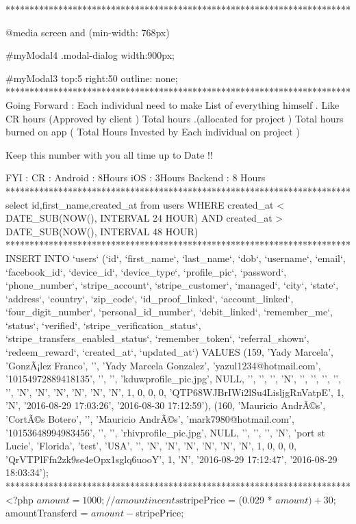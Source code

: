 ************************************************************************

@media screen and (min-width: 768px) {
    
    #myModal4 .modal-dialog  {width:900px;}

}
#myModal3 {
top:5%
right:50%
outline: none;
}
************************************************************************
Going Forward : Each individual need to make List of everything himself .
Like  CR hours (Approved by client )
Total hours .(allocated for project )
Total hours burned on app ( Total Hours Invested by Each individual on project ) 


Keep this number with you all time up to Date !! 


FYI :  
CR : 
Android : 8Hours 
iOS : 3Hours
Backend : 8 Hours
************************************************************************
select id,first_name,created_at from users WHERE created_at < DATE_SUB(NOW(), INTERVAL 24 HOUR)
   AND created_at > DATE_SUB(NOW(), INTERVAL 48 HOUR)
************************************************************************
INSERT INTO `users` (`id`, `first_name`, `last_name`, `dob`, `username`, `email`, `facebook_id`, `device_id`, `device_type`, `profile_pic`, `password`, `phone_number`, `stripe_account`, `stripe_customer`, `managed`, `city`, `state`, `address`, `country`, `zip_code`, `id_proof_linked`, `account_linked`, `four_digit_number`, `personal_id_number`, `debit_linked`, `remember_me`, `status`, `verified`, `stripe_verification_status`, `stripe_transfers_enabled_status`, `remember_token`, `referral_shown`, `redeem_reward`, `created_at`, `updated_at`) VALUES
(159,   'Yady Marcela', 'GonzÃ¡lez Franco', '', 'Yady Marcela Gonzalez',    'yazul1234@hotmail.com',    '10154972889418135',    '', '', 'kduwprofile_pic.jpg',  NULL,   '', '', '', 'N',    '', '', '', '', '', 'N',    'N',    'N',    'N',    'N',    'N',    1,  0,  0,  0,  'QTP68WJBrIWi2lSu4LisljgRnVatpE',   1,  'N',    '2016-08-29 17:03:26',  '2016-08-30 17:12:59'),
(160,   'Mauricio AndrÃ©s', 'CortÃ©s Botero',   '', 'Mauricio AndrÃ©s', 'mark7980@hotmail.com', '10153648994983456',    '', '', 'rhivprofile_pic.jpg',  NULL,   '', '', '', 'N',    'port st Lucie',    'Florida',  'test', 'USA',  '', 'N',    'N',    'N',    'N',    'N',    'N',    1,  0,  0,  0,  'QrVTPlFfn2zk9se4eOpx1sglq6uooY',   1,  'N',    '2016-08-29 17:12:47',  '2016-08-29 18:03:34');
************************************************************************
<?php
$amount = 1000; // amount in cents
$stripePrice = (0.029 * $amount)+30;
$amountTransferd = $amount - $stripePrice;

